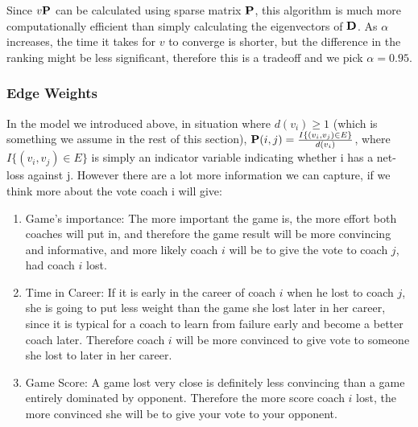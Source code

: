 \documentclass[titlepage]{article}
\begin{document}

\vspace{5mm}

\noindent Since $v {\bf P}$ can be calculated using sparse matrix ${\bf P}$, this algorithm is much more computationally efficient than simply calculating the eigenvectors of ${\bf D}$. As $\alpha$ increases, the time it takes for $v$ to converge is shorter, but the difference in the ranking might be less significant, therefore this is a tradeoff and we pick $\alpha = 0.95$.

\subsubsection*{Edge Weights}

\noindent In the model we introduced above, in situation where $d(v_i) \geq 1$ (which is something we assume in the rest of this section), ${\bf P}(i, j) = \frac{ I\{(v_i, v_j) \in E\}}{d(v_i)}$, where $I\{(v_i, v_j) \in E\}$ is simply an indicator variable indicating whether i has a net-loss against j. However there are a lot more information we can capture, if we think more about the vote coach i will give:

\begin{enumerate}
\item Game's importance: The more important the game is, the more effort both coaches will put in, and therefore the game result will be more convincing and informative, and more likely coach $i$ will be to give the vote to coach $j$, had coach $i$ lost.
\item Time in Career: If it is early in the career of coach $i$ when he lost to coach $j$, she is going to put less weight than the game she lost later in her career, since it is typical for a coach to learn from failure early and become a better coach later. Therefore coach $i$ will be more convinced to give vote to someone she lost to later in her career.
\item Game Score: A game lost very close is definitely less convincing than a game entirely dominated by opponent. Therefore the more score coach $i$ lost, the more convinced she will be to give your vote to your opponent.
\end{enumerate}
\end{document}
